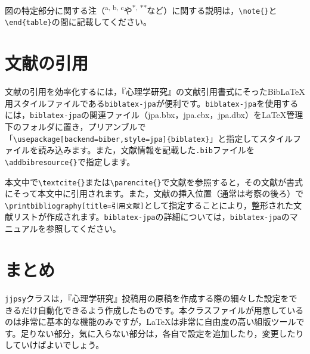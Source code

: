 \documentclass{jjpsy}
\begin{document}
図の特定部分に関する注（\textsuperscript{a, b, c}や\textsuperscript{*, **}など）に関する説明は，\texttt{\textbackslash{}note\{\}}と\texttt{\textbackslash{}end\{table\}}の間に記載してください。

\section{文献の引用}

文献の引用を効率化するには，『心理学研究』の文献引用書式にそったBib\LaTeX{}用スタイルファイルである\texttt{biblatex-jpa}が便利です。\texttt{biblatex-jpa}を使用するには，\texttt{biblatex-jpa}の関連ファイル（jpa.bbx，jpa.cbx，jpa.dbx）を\LaTeX{}管理下のフォルダに置き，プリアンブルで「\texttt{\textbackslash{}usepackage[backend=biber,style=jpa]\{biblatex\}}」と指定してスタイルファイルを読み込みます。また，文献情報を記載した\texttt{.bib}ファイルを\texttt{\textbackslash{}addbibresource\{\}}で指定します。

本文中で\texttt{\textbackslash{}textcite\{\}}または\texttt{\textbackslash{}parencite\{\}}で文献を参照すると，その文献が書式にそって本文中に引用されます。また，文献の挿入位置（通常は考察の後ろ）で\texttt{\textbackslash{}printbibliography[title=引用文献]}として指定することにより，整形された文献リストが作成されます。\texttt{biblatex-jpa}の詳細については，\texttt{biblatex-jpa}のマニュアルを参照してください。

\section{まとめ}

\texttt{jjpsy}クラスは，『心理学研究』投稿用の原稿を作成する際の細々した設定をできるだけ自動化できるよう作成したものです。本クラスファイルが用意しているのは非常に基本的な機能のみですが，\LaTeX{}は非常に自由度の高い組版ツールです。足りない部分，気に入らない部分は，各自で設定を追加したり，変更したりしていけばよいでしょう。

\printbibliography[title=引用文献]

\noteshere 
\end{document}
